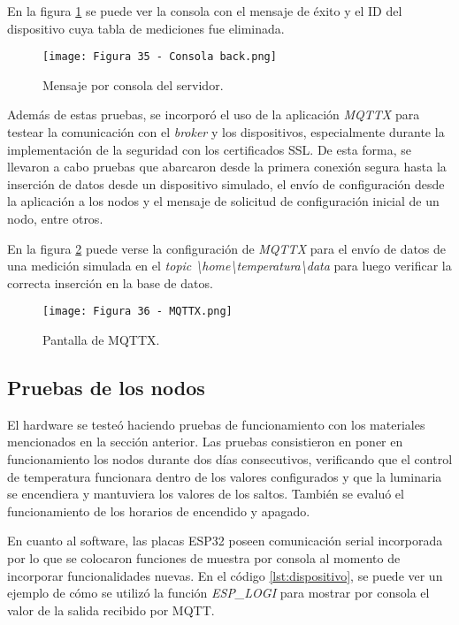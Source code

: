 En la figura \ref{fig:35} se puede ver la consola con el mensaje de éxito y el ID del dispositivo cuya tabla de mediciones fue eliminada.

\begin{figure}[h]
\centering
\texttt{[image: Figura 35 - Consola back.png]}
\caption[Mensaje por consola del servidor en el backend]{Mensaje por consola del servidor.}
\label{fig:35}
\end{figure}

Además de estas pruebas, se incorporó el uso de la aplicación \textit{MQTTX} para testear la comunicación con el \textit{broker} y los dispositivos, especialmente durante la implementación de la seguridad con los certificados SSL. De esta forma, se llevaron a cabo pruebas que abarcaron desde la primera conexión segura hasta la inserción de datos desde un dispositivo simulado, el envío de configuración desde la aplicación a los nodos y el mensaje de solicitud de configuración inicial de un nodo, entre otros.

En la figura \ref{fig:36} puede verse la configuración de \textit{MQTTX} para el envío de datos de una medición simulada en el \textit{topic \textbackslash home\textbackslash temperatura\textbackslash data} para luego verificar la correcta inserción en la base de datos.

\begin{figure}[h]
\centering
\texttt{[image: Figura 36 - MQTTX.png]}
\caption[Pantalla de MQTTX]{Pantalla de MQTTX.}
\label{fig:36}
\end{figure}

\subsection{Pruebas de los nodos}

El hardware se testeó haciendo pruebas de funcionamiento con los materiales mencionados en la sección anterior. Las pruebas consistieron en poner en funcionamiento los nodos durante dos días consecutivos, verificando que el control de temperatura funcionara dentro de los valores configurados y que la luminaria se encendiera y mantuviera los valores de los saltos. También se evaluó el funcionamiento de los horarios de encendido y apagado.

En cuanto al software, las placas ESP32 poseen comunicación serial incorporada por lo que se colocaron funciones de muestra por consola al momento de incorporar funcionalidades nuevas. En el código \ref{lst:dispositivo}, se puede ver un ejemplo de cómo se utilizó la función \textit{ESP\_LOGI} para mostrar por consola el valor de la salida recibido por MQTT.

